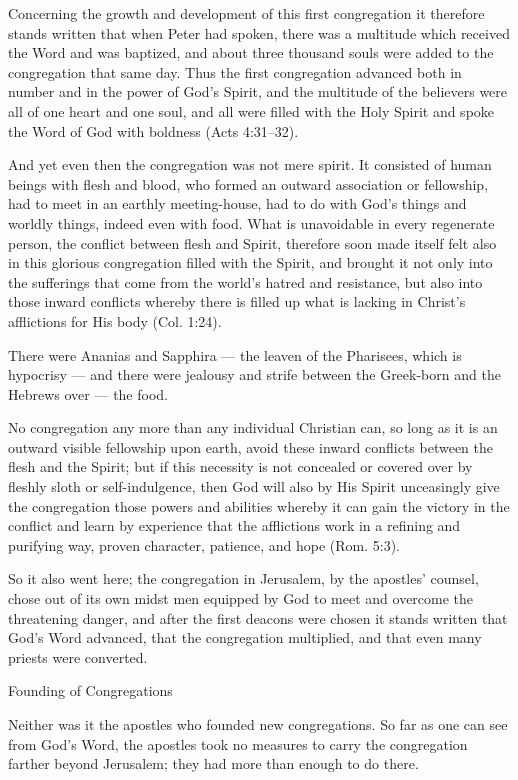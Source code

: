 Concerning the growth and development of this first congregation it therefore stands written that when Peter had spoken, there was a multitude which received the Word and was baptized, and about three thousand souls were added to the congregation that same day. Thus the first congregation advanced both in number and in the power of God’s Spirit, and the multitude of the believers were all of one heart and one soul, and all were filled with the Holy Spirit and spoke the Word of God with boldness (Acts 4:31–32).

And yet even then the congregation was not mere spirit. It consisted of human beings with flesh and blood, who formed an outward association or fellowship, had to meet in an earthly meeting-house, had to do with God’s things and worldly things, indeed even with food. What is unavoidable in every regenerate person, the conflict between flesh and Spirit, therefore soon made itself felt also in this glorious congregation filled with the Spirit, and brought it not only into the sufferings that come from the world’s hatred and resistance, but also into those inward conflicts whereby there is filled up what is lacking in Christ’s afflictions for His body (Col. 1:24).

There were Ananias and Sapphira — the leaven of the Pharisees, which is hypocrisy — and there were jealousy and strife between the Greek-born and the Hebrews over — the food.

No congregation any more than any individual Christian can, so long as it is an outward visible fellowship upon earth, avoid these inward conflicts between the flesh and the Spirit; but if this necessity is not concealed or covered over by fleshly sloth or self-indulgence, then God will also by His Spirit unceasingly give the congregation those powers and abilities whereby it can gain the victory in the conflict and learn by experience that the afflictions work in a refining and purifying way, proven character, patience, and hope (Rom. 5:3).

So it also went here; the congregation in Jerusalem, by the apostles’ counsel, chose out of its own midst men equipped by God to meet and overcome the threatening danger, and after the first deacons were chosen it stands written that God’s Word advanced, that the congregation multiplied, and that even many priests were converted.

Founding of Congregations

Neither was it the apostles who founded new congregations. So far as one can see from God’s Word, the apostles took no measures to carry the congregation farther beyond Jerusalem; they had more than enough to do there.

